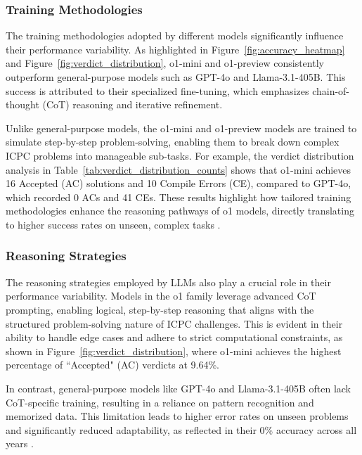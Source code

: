 \subsubsection{Training Methodologies}
The training methodologies adopted by different models significantly influence their performance variability. As highlighted in Figure~\ref{fig:accuracy_heatmap} and Figure~\ref{fig:verdict_distribution}, o1-mini and o1-preview consistently outperform general-purpose models such as GPT-4o and Llama-3.1-405B. This success is attributed to their specialized fine-tuning, which emphasizes chain-of-thought (CoT) reasoning and iterative refinement.

Unlike general-purpose models, the o1-mini and o1-preview models are trained to simulate step-by-step problem-solving, enabling them to break down complex ICPC problems into manageable sub-tasks\cite{Patel2021Are}. For example, the verdict distribution analysis in Table~\ref{tab:verdict_distribution_counts} shows that o1-mini achieves 16 Accepted (AC) solutions and 10 Compile Errors (CE), compared to GPT-4o, which recorded 0 ACs and 41 CEs. These results highlight how tailored training methodologies enhance the reasoning pathways of o1 models, directly translating to higher success rates on unseen, complex tasks \cite{b4, b13}.

\subsubsection{Reasoning Strategies}
The reasoning strategies employed by LLMs also play a crucial role in their performance variability. Models in the o1 family leverage advanced CoT prompting, enabling logical, step-by-step reasoning that aligns with the structured problem-solving nature of ICPC challenges. This is evident in their ability to handle edge cases and adhere to strict computational constraints, as shown in Figure~\ref{fig:verdict_distribution}, where o1-mini achieves the highest percentage of ``Accepted" (AC) verdicts at 9.64\%.

In contrast, general-purpose models like GPT-4o and Llama-3.1-405B often lack CoT-specific training, resulting in a reliance on pattern recognition and memorized data. This limitation leads to higher error rates on unseen problems and significantly reduced adaptability, as reflected in their 0\% accuracy across all years \cite{b27}.

